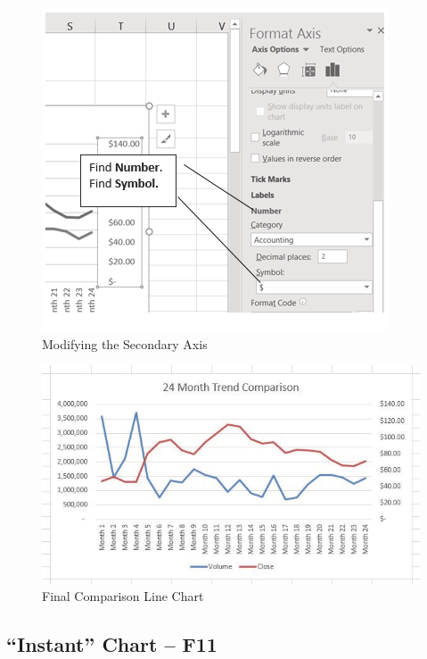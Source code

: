 \begin{figure}[H]
	\centering
	\includegraphics[width=\maxwidth{.95\linewidth}]{gfx/ch04_fig11}
	\caption{Modifying the Secondary Axis}
	\label{04:fig11}
\end{figure}





\begin{figure}[H]
	\centering
	\includegraphics[width=\maxwidth{.95\linewidth}]{gfx/ch04_fig12}
	\caption{Final Comparison Line Chart}
	\label{04:fig12}
\end{figure}





\subsection{``Instant'' Chart – F11}

